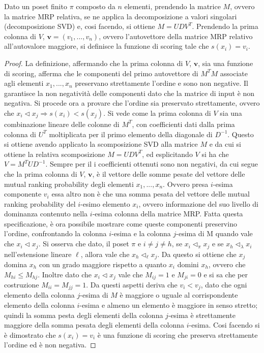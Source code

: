 \documentclass{report}
\begin{document}
\begin{definition}
Dato un poset finito $\pi$ composto da $n$ elementi, prendendo la matrice $M$, ovvero la matrice MRP relativa, se ne applica la decomposizione a valori singolari (decomposizione SVD) e, cosi facendo, si ottiene $M=UDV^T$.
Prendendo la prima colonna di $V$, $ \textbf{v} = (v_1, ...,v_n)$, ovvero l'autovettore della matrice MRP relativo all'autovalore maggiore, si definisce la funzione di scoring tale che $s(x_i) = v_i$.
\end{definition}

\renewcommand \qedsymbol{c.v.d.}
\begin{proof}
La definizione, affermando che la prima colonna di $V$, $ \textbf{v}$, sia una funzione di scoring, afferma che le componenti del primo autovettore di $M^TM$ associate agli elementi $x_1, ...,x_n$ preservano strettamente l'ordine e sono non negative.
Il  garantisce la non negatività delle componenti dato che la matrice di input è non negativa. Si procede ora a provare che l'ordine sia preservato strettamente, ovvero che  $x_i \lhd x_j \Rightarrow s(x_i) < s(x_j)$. 
Si vede come la prima colonna di $V$ sia una combinazione lineare delle colonne di $M^T$, con coefficienti dati dalla prima colonna di $U^T$ moltiplicata per il primo elemento della diagonale di $D^{-1}$. Questo si ottiene avendo applicato la scomposizione SVD alla matrice $M$ e da cui si ottiene la relativa scomposizione $M=UDV^T$, ed esplicitando $V$ si ha che $V=M^TUD^{-1}$.
Sempre per il  i coefficienti ottenuti sono non negativi, da cui segue che la prima colonna di $V$, $ \textbf{v}$, è il vettore delle somme pesate del vettore delle mutual ranking probability degli elementi $x_1, ...,x_n$. Ovvero presa $i$-esima componente $v_i$ essa altro non è che una somma pesata del vettore delle mutual ranking probability del $i$-esimo elemento $x_i$, ovvero informazione del suo livello di dominanza contenuto nella $i$-esima colonna della matrice MRP.
Fatta questa specificazione, è ora possibile mostrare come queste componenti preservino l'ordine, confrontando la colonna $i$-esima e la colonna $j$-esima di M quando vale che $x_i \lhd x_j$.
Si osserva che dato, il poset $\pi$ e $i\neq j \neq h$, se $x_i \lhd_{\pi} x_j$ e se $x_h \lhd_{\lambda} x_i$ nell'estensione lineare $\ell$, allora vale che $x_h \lhd_{\ell} x_j$. Da questo si ottiene che $x_j$ domina $x_h$ con un grado maggiore rispetto a quanto $x_i$ domini $x_h$, ovvero che $M_{hi} \leq M_{hj}$. Inoltre dato che $x_i \lhd x_j$ vale che $M_{ij}=1$ e $M_{ji}=0$ e si sa che per costruzione $M_{ii}=M_{jj}=1$. Da questi aspetti deriva che $v_i<v_j$, dato che ogni elemento della colonna $j$-esima di $M$ è maggiore o uguale al corrispondente elemento della colonna $i$-esima e almeno un elemento è maggiore in senso stretto; quindi la somma pesta degli elementi della colonna $j$-esima è strettamente maggiore della somma pesata degli elementi della colonna $i$-esima.
Cosi facendo si è dimostrato che  $s(x_i) = v_i$ è una funzione di scoring che preserva strettamente l'ordine ed è non negativa.
\end{proof}
\end{document}
